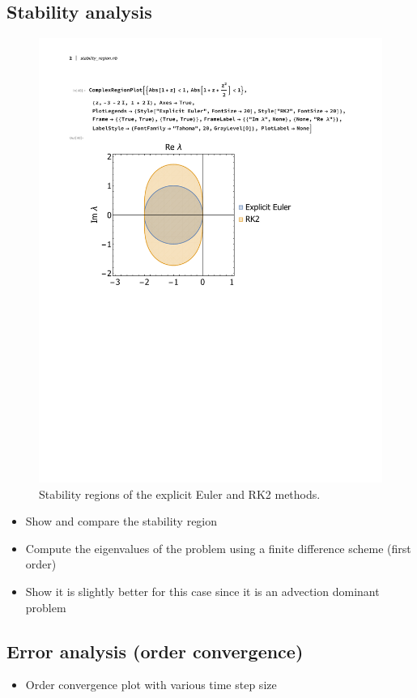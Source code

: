\subsection{Stability analysis}
\begin{figure}[ht]
  \begin{center}
    \includegraphics[scale=0.7]{figures/fig_stability_RK_Euler.pdf}
    \end{center}
  \caption{Stability regions of the explicit Euler and RK2 methods. }
  \label{fig_stability_RK_Euler}
\end{figure}
\begin{itemize}
  \item Show and compare the stability region
  \item Compute the eigenvalues of the problem using a finite difference scheme (first order)
  \item Show it is slightly better for this case since it is an advection dominant problem
\end{itemize}
\subsection{Error analysis (order convergence)}
\begin{itemize}
  \item Order convergence plot with various time step size 
\end{itemize}

